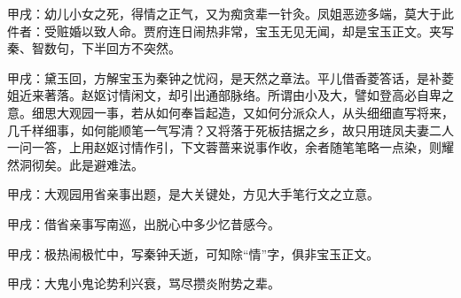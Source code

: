 
\begin{parag}

    \begin{note}甲戌：幼儿小女之死，得情之正气，又为痴贪辈一针灸。凤姐恶迹多端，莫大于此件者：受赃婚以致人命。贾府连日闹热非常，宝玉无见无闻，却是宝玉正文。夹写秦、智数句，下半回方不突然。\end{note}
\end{parag}


\begin{parag}


    \begin{note}甲戌：黛玉回，方解宝玉为秦钟之忧闷，是天然之章法。平儿借香菱答话，是补菱姐近来著落。赵妪讨情闲文，却引出通部脉络。所谓由小及大，譬如登高必自卑之意。细思大观园一事，若从如何奉旨起造，又如何分派众人，从头细细直写将来，几千样细事，如何能顺笔一气写清？又将落于死板拮据之乡，故只用琏凤夫妻二人一问一答，上用赵妪讨情作引，下文蓉蔷来说事作收，余者随笔笔略一点染，则耀然洞彻矣。此是避难法。\end{note}
\end{parag}


\begin{parag}


    \begin{note}甲戌：大观园用省亲事出题，是大关键处，方见大手笔行文之立意。\end{note}
\end{parag}


\begin{parag}


    \begin{note}甲戌：借省亲事写南巡，出脱心中多少忆昔感今。\end{note}
\end{parag}


\begin{parag}


    \begin{note}甲戌：极热闹极忙中，写秦钟夭逝，可知除“情”字，俱非宝玉正文。\end{note}
\end{parag}


\begin{parag}


    \begin{note}甲戌：大鬼小鬼论势利兴衰，骂尽攒炎附势之辈。\end{note}
\end{parag}


